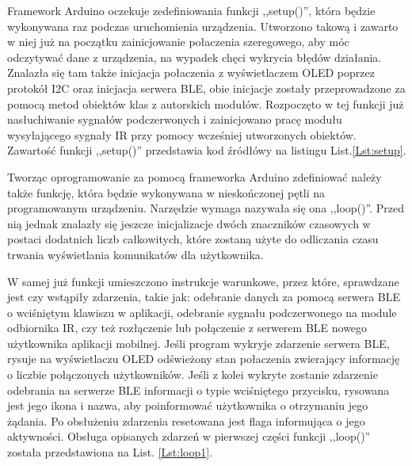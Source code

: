\documentclass[12pt,twoside,draft]{article}
\begin{document}


Framework Arduino oczekuje zedefiniowania funkcji ,,setup()'', która będzie wykonywana raz podczas uruchomienia urządzenia. Utworzono takową i zawarto w niej już na początku zainicjowanie połaczenia szeregowego, aby móc odczytywać dane z urządzenia, na wypadek chęci wykrycia błędów działania. Znalazła się tam także inicjacja połaczenia z wyświetlaczem OLED poprzez protokół I2C oraz inicjacja serwera BLE, obie inicjacje zostały przeprowadzone za pomocą metod obiektów klas z autorskich modułów. Rozpoczęto w tej funkcji już nasłuchiwanie sygnałów podczerwonych i zainicjowano pracę modułu wysyłającego sygnały IR przy pomocy wcześniej utworzonych obiektów. Zawartość funkcji ,,setup()'' przedstawia kod źródłówy na listingu List.\ref*{Lst:setup}.



Tworząc oprogramowanie za pomocą frameworka Arduino zdefiniować należy także funkcję, która będzie wykonywana w nieskończonej pętli na programowanym urządzeniu. Narzędzie wymaga nazywała się ona ,,loop()''. Przed nią jednak znalazły się jeszcze inicjalizacje dwóch znaczników czasowych w postaci dodatnich liczb całkowitych, które zostaną użyte do odliczania czasu trwania wyświetlania komunikatów dla użytkownika.

W samej już funkcji umieszczono instrukcje warunkowe, przez które, sprawdzane jest czy wstąpiły zdarzenia, takie jak: odebranie danych za pomocą serwera BLE o wciśniętym klawiszu w aplikacji, odebranie sygnału podczerwonego na module odbiornika IR, czy też rozłączenie lub połączenie z serwerem BLE nowego użytkownika aplikacji mobilnej. Jeśli program wykryje zdarzenie serwera BLE, rysuje na wyświetlaczu OLED odświeżony stan połaczenia zwierający informację o liczbie połączonych użytkowników. Jeśli z kolei wykryte zostanie zdarzenie odebrania na serwerze BLE informacji o typie wciśniętego przycisku, rysowana jest jego ikona i nazwa, aby poinformować użytkownika o otrzymaniu jego żądania. Po obsłużeniu zdarzenia resetowana jest flaga informująca o jego aktywności. Obsługa opisanych zdarzeń w pierwszej części funkcji ,,loop()'' została przedstawiona na List. \ref*{Lst:loop1}.

\end{document}
